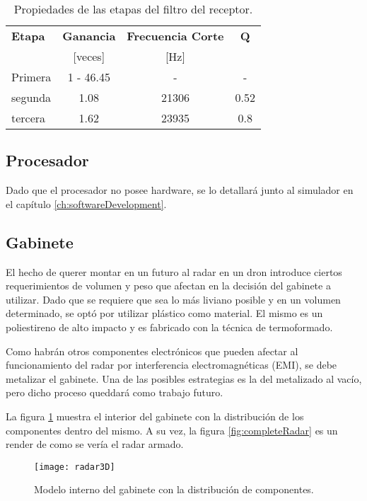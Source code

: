 \begin{table}[htb]
  \caption{Propiedades de las etapas del filtro del receptor.}
  \centering
  \label{tab:lowPassProperties}
  \begin{tabular}{l c c c}
  \toprule
  \textbf{Etapa} & \textbf{Ganancia} & \textbf{Frecuencia Corte} & \textbf{Q} \tabularnewline
   & [veces] & [Hz] & \tabularnewline
  \midrule
  Primera & 1 - 46.45 & - & - \tabularnewline

  segunda & 1.08 & 21306 & 0.52 \tabularnewline

  tercera & 1.62 & 23935 & 0.8 \tabularnewline

  \bottomrule
  \end{tabular}
\end{table}

\subsection{Procesador}

Dado que el procesador no posee hardware, se lo detallará junto al simulador en el capítulo \ref{ch:softwareDevelopment}.

\subsection{Gabinete}

El hecho de querer montar en un futuro al radar en un dron introduce ciertos requerimientos de volumen y peso que afectan en la decisión del gabinete a utilizar. Dado que se requiere que sea lo más liviano posible y en un volumen determinado, se optó por utilizar plástico como material. El mismo es un poliestireno de alto impacto y es fabricado con la técnica de termoformado. 

Como habrán otros componentes electrónicos que pueden afectar al funcionamiento del radar por interferencia electromagnéticas (EMI), se debe metalizar el gabinete. Una de las posibles estrategias es la del metalizado al vacío, pero dicho proceso queddará como trabajo futuro.

La figura \ref{fig:radar3D} muestra el interior del gabinete con la distribución de los componentes dentro del mismo. A su vez, la figura \ref{fig:completeRadar} es un render de como se vería el radar armado.

\begin{figure}[H]
 \centering
 \texttt{[image: radar3D]}
 \caption{Modelo interno del gabinete con la distribución de componentes.}
 \label{fig:radar3D}
\end{figure}

